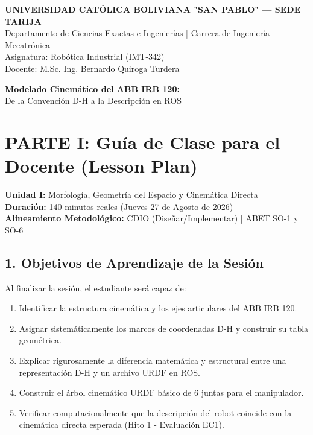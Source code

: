 \documentclass[11pt, a4paper]{article}
\begin{document}
\begin{center}
    \Large\textbf{\textcolor{ucbblue}{UNIVERSIDAD CATÓLICA BOLIVIANA "SAN PABLO" — SEDE TARIJA}}\\
    \vspace{0.2cm}
    \normalsize Departamento de Ciencias Exactas e Ingenierías | Carrera de Ingeniería Mecatrónica\\
    Asignatura: Robótica Industrial (IMT-342) \\
    Docente: M.Sc. Ing. Bernardo Quiroga Turdera
\end{center}

\vspace{0.4cm}
\begin{tcolorbox}[colback=ucbblue!5!white, colframe=ucbblue, title=\textbf{Documento Maestro: Guía de Clase y Laboratorio (URDF)}]
    \centering \large \textbf{Modelado Cinemático del ABB IRB 120:} \\ De la Convención D-H a la Descripción en ROS
\end{tcolorbox}
\vspace{0.4cm}

\section*{PARTE I: Guía de Clase para el Docente (Lesson Plan)}

\noindent\textbf{Unidad I:} Morfología, Geometría del Espacio y Cinemática Directa \\
\textbf{Duración:} 140 minutos reales (Jueves 27 de Agosto de 2026) \\
\textbf{Alineamiento Metodológico:} CDIO (Diseñar/Implementar) | ABET SO-1 y SO-6

\subsection*{1. Objetivos de Aprendizaje de la Sesión}
Al finalizar la sesión, el estudiante será capaz de:
\begin{enumerate}
    \item Identificar la estructura cinemática y los ejes articulares del ABB IRB 120.
    \item Asignar sistemáticamente los marcos de coordenadas D-H y construir su tabla geométrica.
    \item Explicar rigurosamente la diferencia matemática y estructural entre una representación D-H y un archivo URDF en ROS.
    \item Construir el árbol cinemático URDF básico de 6 juntas para el manipulador.
    \item Verificar computacionalmente que la descripción del robot coincide con la cinemática directa esperada (Hito 1 - Evaluación EC1).
\end{enumerate}
\end{document}
